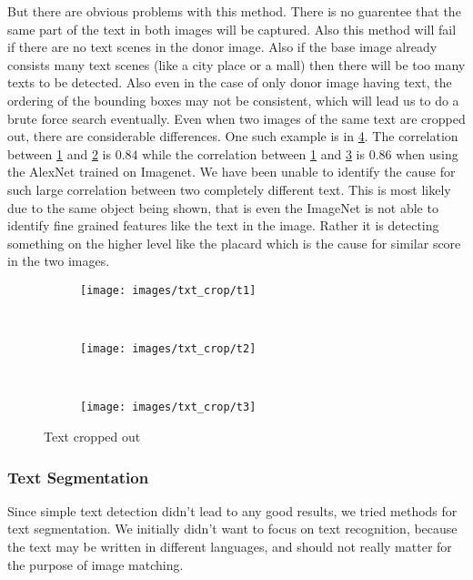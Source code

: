 \documentclass{article}
\begin{document}
But there are obvious problems with this method. There is no guarentee that the same part of the text in both images will be captured. Also this method will fail if there are no text scenes in the donor image. Also if the base image already consists many text scenes (like a city place or a mall) then there will be too many texts to be detected. Also even in the case of only donor image having text, the ordering of the bounding boxes may not be consistent, which will lead us to do a brute force search eventually. Even when two images of the same text are cropped out, there are considerable differences. One such example is in \ref{fig:txt_l}. The correlation between \ref{fig:t1} and \ref{fig:t2} is $0.84$ while the correlation between \ref{fig:t1} and \ref{fig:t3} is $0.86$ when using the AlexNet trained on Imagenet. We have been unable to identify the cause for such large correlation between two completely different text. This is most likely due to the same object being shown, that is even the ImageNet is not able to identify fine grained features like the text in the image. Rather it is detecting something on the higher level like the placard which is the cause for similar score in the two images.

\begin{figure}[H]
  \centering
  \begin{subfigure}[H]{0.1\linewidth}
    \texttt{[image: images/txt\_crop/t1]}
    \caption{}
    \label{fig:t1}
  \end{subfigure}
  ~
  \begin{subfigure}[H]{0.1\linewidth}
    \texttt{[image: images/txt\_crop/t2]}
    \caption{}
    \label{fig:t2}
  \end{subfigure}
  ~
  \begin{subfigure}[H]{0.1\linewidth}
    \texttt{[image: images/txt\_crop/t3]}
    \caption{}
    \label{fig:t3}
  \end{subfigure}
  \caption{Text cropped out}
  \label{fig:txt_l}
\end{figure}

\subsubsection{Text Segmentation}
Since simple text detection didn't lead to any good results, we tried methods for text segmentation. We initially didn't want to focus on text recognition, because the text may be written in different languages, and should not really matter for the purpose of image matching.
\end{document}

